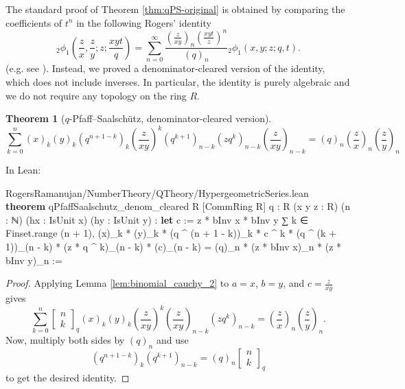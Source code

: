 \documentclass[12pt]{amsart}
\newtheorem{theorem}{Theorem}[subsection]
\theoremstyle{definition}
\theoremstyle{remark}
\numberwithin{equation}{subsection}
\newcommand{\kw}[1]{\textcolor{keywordcolor}{\textbf{#1}}}
\newcommand{\var}[1]{\textcolor{tacticcolor}{#1}}
\newcommand{\num}[1]{\textcolor{numcolor}{#1}}
\newcommand{\imp}[1]{\textcolor{commentcolor}{\textbraceleft#1\textbraceright}}
\begin{document}
The standard proof of Theorem \ref{thm:qPS-original} is obtained by comparing the coefficients of $t^n$ in the following Rogers' identity
\begin{equation}
    {}_{2}\phi_{1}\left(\frac{z}{x}, \frac{z}{y}; z; \frac{xyt}{q}\right) = \sum_{n=0}^{\infty} \frac{\left(\frac{z}{xy}\right)_n\left(\frac{xyt}{z}\right)^n}{(q)_n} {}_{2}\phi_{1}(x,y;z;q,t).
\end{equation}
(e.g. see \cite{Watson1929}).
Instead, we proved a denominator-cleared version of the identity, which does not include inverses.
In particular, the identity is purely algebraic and we do not require any topology on the ring $R$.
\begin{theorem}[$q$-Pfaff--Saalsch\"utz, denominator-cleared version]
\label{thm:qPS-cleared}
    \begin{equation}
        \sum_{k=0}^{n} (x)_k (y)_k (q^{n+1-k})_k \left(\frac{z}{xy}\right)^{k} (q^{k+1})_{n-k} (zq^k)_{n-k} \left(\frac{z}{xy}\right)_{n-k} = (q)_n \left(\frac{z}{x}\right)_n \left(\frac{z}{y}\right)_n
    \end{equation}
\end{theorem}

In Lean:

\begin{code}{RogersRamanujan/NumberTheory/QTheory/HypergeometricSeries.lean}
\kw{theorem} qPfaffSaalschutz_denom_cleared \imp{R} [CommRing \var{R}] \imp{q : R} (\var{x} \var{y} \var{z} : \var{R}) (\var{n} : ℕ)
  (\var{hx} : IsUnit \var{x}) (\var{hy} : IsUnit \var{y}) :
  \kw{let} \var{c} := \var{z} * bInv \var{x} * bInv \var{y}
  ∑ \var{k} ∈ Finset.range (\var{n} + \num{1}),
    (\var{x})_\var{k} * (\var{y})_\var{k} * (\var{q} ^ (\var{n} + \num{1} - \var{k}))_\var{k} *
      \var{c} ^ \var{k} * (\var{q} ^ (\var{k} + \num{1}))_(\var{n} - \var{k}) * (\var{z} * \var{q} ^ \var{k})_(\var{n} - \var{k}) * (\var{c})_(\var{n} - \var{k}) =
  (\var{q})_\var{n} * (\var{z} * bInv \var{x})_\var{n} * (\var{z} * bInv \var{y})_\var{n} :=
\end{code}
\begin{proof}
Applying Lemma \ref{lem:binomial_cauchy_2} to $a = x$, $b = y$, and $c = \frac{z}{xy}$ gives
\begin{equation}
    \sum_{k=0}^{n} \begin{bmatrix} n \\ k \end{bmatrix}_q (x)_k (y)_k \left(\frac{z}{xy}\right)^k \left(\frac{z}{xy}\right)_{n-k} (zq^k)_{n-k} = \left(\frac{z}{x}\right)_n \left(\frac{z}{y}\right)_n.
\end{equation}
Now, multiply both sides by $(q)_n$ and use
\begin{equation}
    (q^{n+1-k})_k (q^{k+1})_{n-k} = (q)_n \begin{bmatrix} n \\ k \end{bmatrix}_q
\end{equation}
to get the desired identity.
\end{proof}
\end{document}
